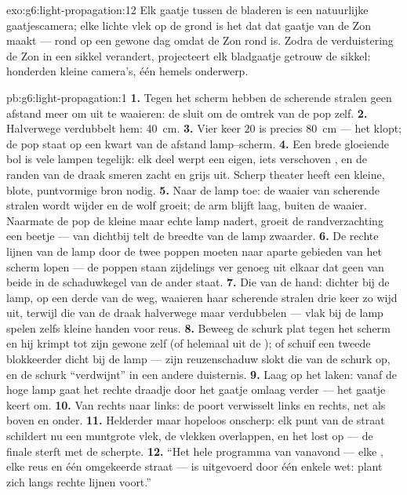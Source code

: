 \begin{solution}{exo:g6:light-propagation:12}
Elk gaatje tussen de bladeren is een natuurlijke gaatjescamera; elke
lichte vlek op de grond is het  dat dat gaatje van de Zon maakt
--- rond op een gewone dag omdat de Zon rond is. Zodra de verduistering
de Zon in een sikkel verandert, projecteert elk bladgaatje getrouw de
sikkel: honderden kleine camera's, één hemels onderwerp.
\end{solution}

\begin{solution}{pb:g6:light-propagation:1}
\textbf{1.} Tegen het scherm hebben de scherende stralen geen afstand
meer om uit te waaieren: de  sluit om de omtrek van de pop zelf.
\textbf{2.} Halverwege verdubbelt hem: \qty{40}{cm}.
\textbf{3.} Vier keer $20$ is precies \qty{80}{cm} --- het klopt; de
pop staat op een kwart van de afstand lamp--scherm.
\textbf{4.} Een brede gloeiende bol is vele lampen tegelijk: elk deel
werpt een eigen, iets verschoven , en de randen van de draak
smeren zacht en grijs uit. Scherp theater heeft een kleine, blote,
puntvormige bron nodig.
\textbf{5.} Naar de lamp toe: de waaier van scherende stralen wordt
wijder en de wolf groeit; de arm blijft laag, buiten de waaier.
Naarmate de pop de kleine maar echte lamp nadert, groeit de
randverzachting een beetje --- van dichtbij telt de breedte van de
lamp zwaarder.
\textbf{6.} De rechte lijnen van de lamp door de twee poppen moeten
naar aparte gebieden van het scherm lopen --- de poppen staan
zijdelings ver genoeg uit elkaar dat geen van beide in de
schaduwkegel van de ander staat.
\textbf{7.} Die van de hand: dichter bij de lamp, op een derde van de
weg, waaieren haar scherende stralen drie keer zo wijd uit, terwijl
die van de draak halverwege maar verdubbelen --- vlak bij de lamp
spelen zelfs kleine handen voor reus.
\textbf{8.} Beweeg de schurk plat tegen het scherm en hij krimpt tot
zijn gewone zelf (of helemaal uit de ); of schuif een tweede
blokkeerder dicht bij de lamp --- zijn reuzenschaduw slokt die van de
schurk op, en de schurk ``verdwijnt'' in een andere duisternis.
\textbf{9.} Laag op het laken: vanaf de hoge lamp gaat het rechte
draadje door het gaatje omlaag verder --- het gaatje keert om.
\textbf{10.} Van rechts naar links: de poort verwisselt links en
rechts, net als boven en onder.
\textbf{11.} Helderder maar hopeloos onscherp: elk punt van de straat
schildert nu een muntgrote vlek, de vlekken overlappen, en het 
lost op --- de finale sterft met de scherpte.
\textbf{12.} ``Het hele programma van vanavond --- elke
, elke reus en één omgekeerde straat --- is uitgevoerd door
één enkele wet:  plant zich langs rechte lijnen voort.''
\end{solution}
